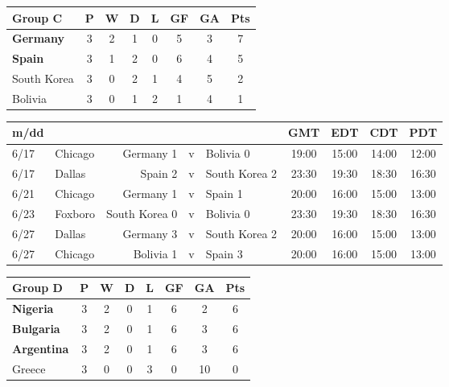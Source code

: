 \begin{figure}[H]
\begin{tabular}{l*{7}{c}}
Group C & P & W & D & L & GF & GA & Pts \\ \hline
\textbf{Germany} & 3 & 2 & 1 & 0 & 5 & 3 & 7 \\
\textbf{Spain} & 3 & 1 & 2 & 0 & 6 & 4 & 5 \\
South Korea & 3 & 0 & 2 & 1 & 4 & 5 & 2 \\
Bolivia & 3 & 0 & 1 & 2 & 1 & 4 & 1 \\ \hline
\end{tabular}
\end{figure}
\begin{figure}[H]

\begin{tabular}{l l r c l c c c c}
m/dd  & & & & & GMT & EDT & CDT & PDT \\ \hline
6/17 & Chicago & Germany 1 & v & Bolivia 0 & 19:00 & 15:00 & 14:00 & 12:00 \\
6/17 & Dallas & Spain 2 & v & South Korea 2 & 23:30 & 19:30 & 18:30 & 16:30 \\
6/21 & Chicago & Germany 1 & v & Spain 1 & 20:00 &16:00 & 15:00 & 13:00 \\
6/23 & Foxboro & South Korea 0 & v & Bolivia 0 & 23:30 & 19:30 & 18:30 & 16:30 \\
6/27 & Dallas & Germany 3 & v & South Korea 2 & 20:00 &16:00 & 15:00 & 13:00 \\
6/27 & Chicago & Bolivia 1 & v & Spain 3 & 20:00 &16:00 & 15:00 & 13:00 \\ \hline
\end{tabular}
\end{figure}
\begin{figure}[H]

\begin{tabular}{l*{7}{c}}
Group D & P & W & D & L & GF & GA & Pts \\ \hline
\textbf{Nigeria} & 3 & 2 & 0 & 1 & 6 & 2 & 6 \\
\textbf{Bulgaria} & 3 & 2 & 0 & 1& 6 & 3 & 6 \\
\textbf{Argentina} & 3 & 2 & 0 & 1 & 6 & 3 & 6 \\
Greece & 3 & 0 & 0 & 3 & 0 & 10 & 0 \\ \hline
\end{tabular}
\end{figure}

